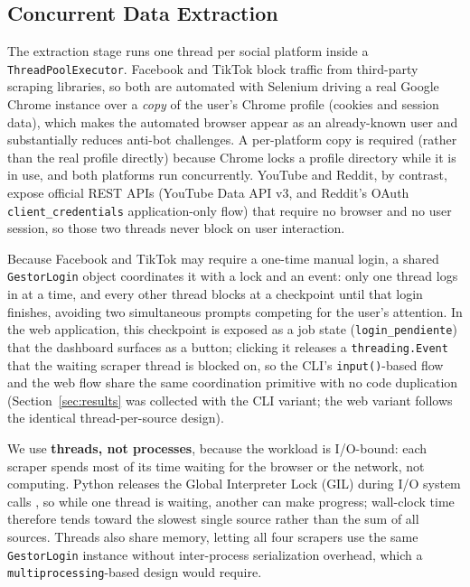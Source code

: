 \documentclass[runningheads]{llncs}
\begin{document}
\subsection{Concurrent Data Extraction}

The extraction stage runs one thread per social platform inside a
\texttt{ThreadPoolExecutor}. Facebook and TikTok block traffic from
third-party scraping libraries, so both are automated with Selenium driving
a real Google Chrome instance over a \emph{copy} of the user's Chrome
profile (cookies and session data), which makes the automated browser appear
as an already-known user and substantially reduces anti-bot challenges. A
per-platform copy is required (rather than the real profile directly)
because Chrome locks a profile directory while it is in use, and both
platforms run concurrently. YouTube and Reddit, by contrast, expose official
REST APIs (YouTube Data API v3, and Reddit's OAuth
\texttt{client\_credentials} application-only flow) that require no browser
and no user session, so those two threads never block on user interaction.

Because Facebook and TikTok may require a one-time manual login, a shared
\texttt{GestorLogin} object coordinates it with a lock and an event: only one
thread logs in at a time, and every other thread blocks at a checkpoint
until that login finishes, avoiding two simultaneous prompts competing for
the user's attention. In the web application, this checkpoint is exposed as
a job state (\texttt{login\_pendiente}) that the dashboard surfaces as a
button; clicking it releases a \texttt{threading.Event} that the waiting
scraper thread is blocked on, so the CLI's \texttt{input()}-based flow and
the web flow share the same coordination primitive with no code
duplication (Section~\ref{sec:results} was collected with the CLI variant;
the web variant follows the identical thread-per-source design).

We use \textbf{threads, not processes}, because the workload is I/O-bound:
each scraper spends most of its time waiting for the browser or the network,
not computing. Python releases the Global Interpreter Lock (GIL) during I/O
system calls \cite{silberschatz2018osconcepts}, so while one thread is
waiting, another can make progress; wall-clock time therefore tends toward
the slowest single source rather than the sum of all sources. Threads also
share memory, letting all four scrapers use the same \texttt{GestorLogin}
instance without inter-process serialization overhead, which a
\texttt{multiprocessing}-based design would require.
\end{document}
